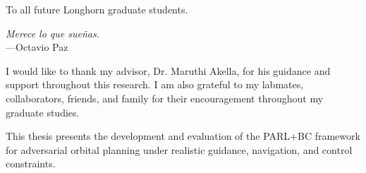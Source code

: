 

\copyrightpage  %

\commcertpage   %

\titlepage      %


\begin{dedication}		%
To all future Longhorn graduate students.
\end{dedication}

\begin{epigraph}		%
\begin{center}
    \textit{Merece lo que sueñas.}
    \\\hspace{4em}---Octavio Paz
\end{center}
\end{epigraph}

\begin{acknowledgments}		%
I would like to thank my advisor, Dr. Maruthi Akella, for his guidance and support throughout this research. I am also grateful to my labmates, collaborators, friends, and family for their encouragement throughout my graduate studies.
\end{acknowledgments}

\begin{preface}		%
This thesis presents the development and evaluation of the PARL+BC framework for adversarial orbital planning under realistic guidance, navigation, and control constraints.
\end{preface}

%
\utabstract

